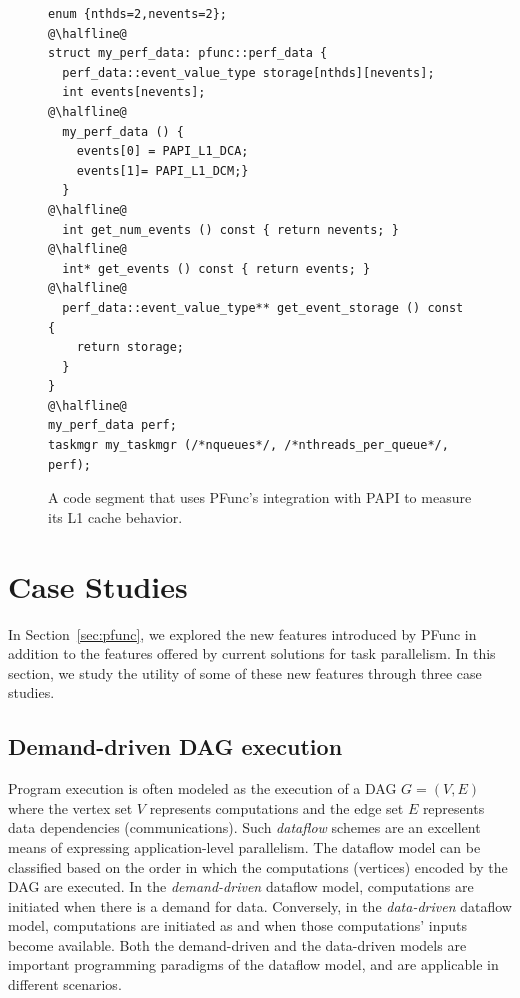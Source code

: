 \documentclass{sig-alternate}
\begin{document}
\begin{figure}[t]
\centering
\begin{lstlisting}[frame=trbl]
enum {nthds=2,nevents=2};
@\halfline@
struct my_perf_data: pfunc::perf_data {
  perf_data::event_value_type storage[nthds][nevents];
  int events[nevents];
@\halfline@
  my_perf_data () {
    events[0] = PAPI_L1_DCA; 
    events[1]= PAPI_L1_DCM;}
  }
@\halfline@
  int get_num_events () const { return nevents; }
@\halfline@
  int* get_events () const { return events; }
@\halfline@
  perf_data::event_value_type** get_event_storage () const {
    return storage; 
  }
}
@\halfline@
my_perf_data perf;
taskmgr my_taskmgr (/*nqueues*/, /*nthreads_per_queue*/, perf);
\end{lstlisting}
\caption{A code segment that uses PFunc's integration with PAPI to measure its
L1 cache behavior.}
\label{fig:perf}
\end{figure}

\section{Case Studies}
\label{sec:cases}
In Section~\ref{sec:pfunc}, we explored the new features introduced by PFunc in
addition to the features offered by current solutions for task parallelism. In
this section, we study the utility of some of these new features through three
case studies.

\subsection{Demand-driven DAG execution}
\label{sec:dag}
Program execution is often modeled as the execution of a DAG $G=(V,E)$ where
the vertex set $V$ represents computations and the edge set $E$ represents data
dependencies (communications). Such \emph{dataflow} schemes are an excellent
means of expressing  application-level parallelism.  The dataflow model can be
classified based on the order in which the computations (vertices) encoded by
the DAG are executed. In the \textit{demand-driven} dataflow model,
computations are initiated when there is a demand for data.  Conversely, in the
\textit{data-driven} dataflow model, computations are initiated as and when
those computations' inputs become available.  Both the demand-driven and the
data-driven models are important programming paradigms of the dataflow model,
and are applicable in different scenarios. 
\end{document}
